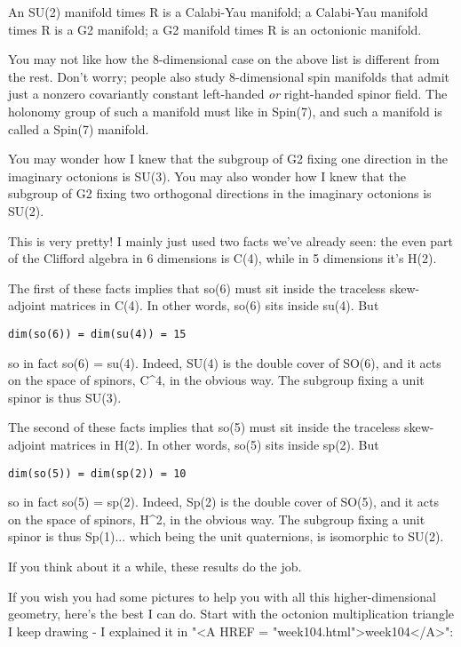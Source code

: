 An SU(2) manifold times R is a Calabi-Yau manifold;
a Calabi-Yau manifold times R is a G2 manifold;
a G2 manifold times R is an octonionic manifold.  

You may not like how the 8-dimensional case on the above list is
different from the rest.  Don't worry; people also study 8-dimensional
spin manifolds that admit just a nonzero covariantly constant
left-handed \emph{or} right-handed spinor field.  The holonomy group of
such a manifold must like in Spin(7), and such a manifold is called a
Spin(7) manifold.

You may wonder how I knew that the subgroup of G2 fixing
one direction in the imaginary octonions is SU(3).  You may
also wonder how I knew that the subgroup of G2 fixing two 
orthogonal directions in the imaginary octonions is SU(2).

This is very pretty!  I mainly just used two facts we've already 
seen: the even part of the Clifford algebra in 6 dimensions is C(4), 
while in 5 dimensions it's H(2).  

The first of these facts implies that so(6) must sit inside
the traceless skew-adjoint matrices in C(4).  In other words, 
so(6) sits inside su(4).  But 

\begin{verbatim}
dim(so(6)) = dim(su(4)) = 15
\end{verbatim}
    
so in fact so(6) = su(4).  Indeed, SU(4) is the double
cover of SO(6), and it acts on the space of spinors, C^{4}, 
in the obvious way.  The subgroup fixing a unit spinor is 
thus SU(3).   

The second of these facts implies that so(5) must sit inside
the traceless skew-adjoint matrices in H(2).  In other words,
so(5) sits inside sp(2).  But

\begin{verbatim}
dim(so(5)) = dim(sp(2)) = 10
\end{verbatim}
    
so in fact so(5) = sp(2).  Indeed, Sp(2) is the double
cover of SO(5), and it acts on the space of spinors, H^{2},
in the obvious way.  The subgroup fixing a unit spinor is
thus Sp(1)... which being the unit quaternions, is isomorphic to SU(2).

If you think about it a while, these results do the job.

If you wish you had some pictures to help you with all this
higher-dimensional geometry, here's the best I can do.  Start
with the octonion multiplication triangle I keep drawing - 
I explained it in "<A HREF = "week104.html">week104</A>": 


